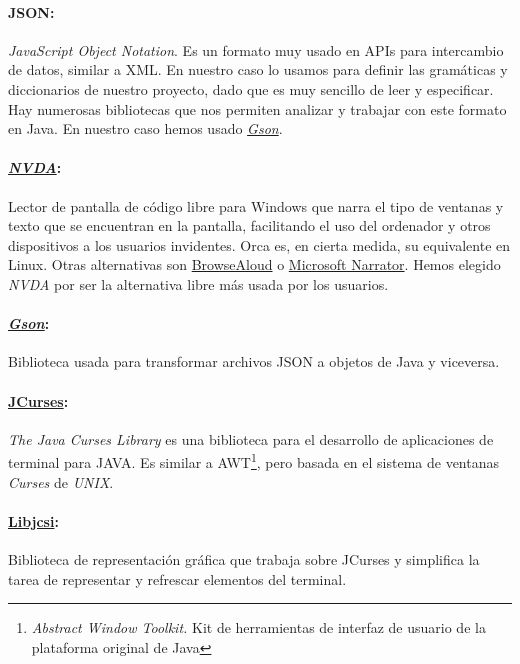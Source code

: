 \paragraph{JSON:} \textit{JavaScript Object Notation}. Es un formato muy usado en APIs para intercambio de datos, similar a XML. En nuestro caso lo usamos para definir las gramáticas y diccionarios de nuestro proyecto, dado que es muy sencillo de leer y especificar. Hay numerosas bibliotecas que nos permiten analizar y trabajar con este formato en Java. En nuestro caso hemos usado \href{https://goo.gl/zPCXen}{\textit{Gson}}.

\paragraph{\href{www.nvaccess.org}{\textit{NVDA}}:} Lector de pantalla de código libre para Windows que narra el tipo de ventanas y texto que se encuentran en la pantalla, facilitando el uso del ordenador y otros dispositivos a los usuarios invidentes. 
Orca es, en cierta medida, su equivalente en Linux. Otras alternativas son \href{https://goo.gl/GoghW7}{BrowseAloud} o \href{http://goo.gl/OAB7VC}{Microsoft Narrator}. Hemos elegido \textit{NVDA} por ser la alternativa libre más usada por los usuarios.

\paragraph{\href{https://goo.gl/zPCXen}{\textit{Gson}}:} Biblioteca usada para transformar archivos JSON a objetos de Java y viceversa.

\paragraph{\href{https://github.com/sunhong/jcurses}{JCurses}:} \textit{The Java Curses Library} es una biblioteca para el desarrollo de aplicaciones de terminal para JAVA. Es similar a AWT\footnote{\textit{Abstract Window Toolkit.} Kit de herramientas de interfaz de usuario de la plataforma original de Java}, pero basada en el sistema de ventanas \textit{Curses} de \textit{UNIX}.

\paragraph{\href{www.slashie.net/libjcsi}{Libjcsi}:} Biblioteca de representación gráfica que trabaja sobre JCurses y simplifica la tarea de representar y refrescar elementos del terminal.

